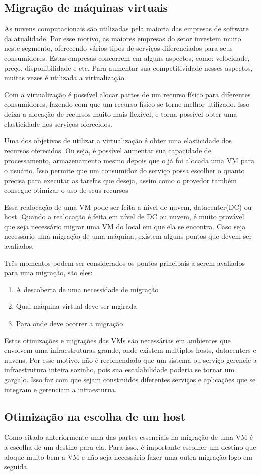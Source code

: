 \subsection{Migração de máquinas virtuais}
As nuvens computacionais são utilizadas pela maioria das empresas de software da atualidade. 
Por esse motivo, as maiores empresas do setor investem muito neste segmento, 
oferecendo vários tipos de serviços diferenciados para seus consumidores. 
Estas empresas concorrem em alguns aspectos, como: velocidade, preço, disponibilidade e etc. 
Para aumentar sua competitividade nesses aspectos, muitas vezes é utilizada a virtualização.

Com a virtualização é possível alocar partes de um recurso físico para diferentes consumidores, 
fazendo com que um recurso físico se torne melhor utilizado. Isso deixa a alocação de recursos
muito mais flexível, e torna possível obter uma elasticidade nos serviços oferecidos. 

Uma dos objetivos de utilizar a virtualização é obter uma elasticidade dos recursos oferecidos.
Ou seja, é possível aumentar sua capacidade de processamento, armazenamento mesmo depois que o
já foi alocada uma VM para o usuário. 
Isso permite que um consumidor do  serviço possa escolher o quanto precisa para executar as tarefas que deseja, 
assim como o provedor também consegue otimizar o uso de seus recursos

Essa realocação de uma VM pode ser feita a nível de nuvem, datacenter(DC) ou host. 
Quando a realocação é feita em nível de DC ou nuvem, é muito provável que seja 
necessário migrar uma VM do local em que ela se encontra. 
Caso seja necessário uma migração de uma máquina, existem alguns pontos que devem ser avaliados.

Três momentos podem ser considerados os pontos principais a serem avaliados para uma migração, 
são eles:

\begin{enumerate}
\item A descoberta de uma necessidade de migração
\item Qual máquina virtual deve ser mgirada
\item Para onde deve ocorrer a migração
\end{enumerate}

Estas otimizações e migrações das VMs são necessárias em ambientes que envolvem uma infraestruturas
grande, onde existem multiplos hosts, datacenters e nuvens. Por esse motivo, não é recomendado que 
um sistema ou serviço gerencie a infraestrutura inteira sozinho, pois sua escalabilidade 
poderia se tornar um gargalo. Isso faz com que sejam construidos diferentes serviços e aplicações 
que se integram e gerenciam a infraesturua.

\subsection{Otimização na escolha de um host}
Como citado anteriormente uma das partes essenciais na migração de uma VM é a escolha de um destino para ela.
Para isso, é importante escolher um destino que aloque muito bem a VM e não seja necessário fazer uma outra
migração logo em seguida. 
